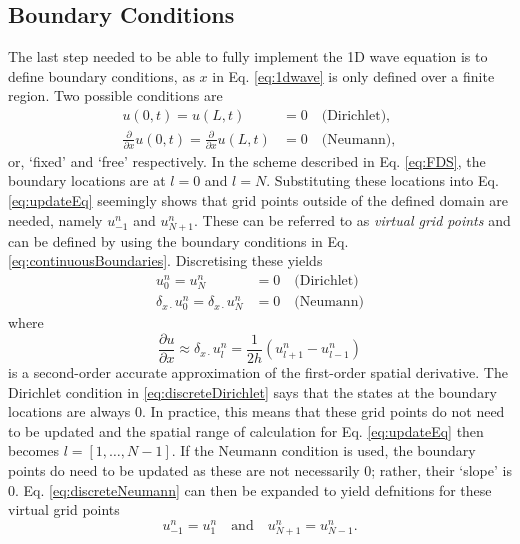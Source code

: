 \documentclass[dvipsnames, reprint]{JASA}
\begin{document}
\subsection{Boundary Conditions}
The last step needed to be able to fully implement the 1D wave equation is to define boundary conditions, as $x$ in Eq. \eqref{eq:1dwave} is only defined over a finite region. Two possible conditions are
\begin{subequations}\label{eq:continuousBoundaries}
    \begin{align}
        u(0, t) = u(L, t) &= 0\quad \text{(Dirichlet)},\label{eq:contDirichlet}\\
        \frac{\partial}{\partial x} u(0, t) = \frac{\partial}{\partial x} u(L, t) &= 0\quad \text{(Neumann)},\label{eq:contNeumann}
    \end{align}
\end{subequations}
or, `fixed' and `free' respectively. In the scheme described in Eq. \eqref{eq:FDS}, the boundary locations are at $l = 0$ and $l = N$. Substituting these locations into Eq. \eqref{eq:updateEq} seemingly shows that grid points outside of the defined domain are needed, namely $u_{-1}^n$ and $u_{N+1}^n$. These can be referred to as \textit{virtual grid points} and can be defined by using the boundary conditions in Eq. \eqref{eq:continuousBoundaries}. Discretising these yields
\begin{subequations}
    \begin{align}
        u_0^n = u_N^n &= 0 \quad\text{(Dirichlet)}\label{eq:discreteDirichlet}\\
        \delta_{x\cdot} u_0^n = \delta_{x\cdot} u_N^n &= 0 \quad \text{(Neumann)}\label{eq:discreteNeumann}
    \end{align}
\end{subequations}
where 
\begin{equation}
    \frac{\partial u}{\partial x} \approx \delta_{x\cdot}u_l^n = \frac{1}{2h}\left(u_{l+1}^n - u_{l-1}^n\right)
\end{equation}
is a second-order accurate approximation of the first-order spatial derivative. The Dirichlet condition in \eqref{eq:discreteDirichlet} says that the states at the boundary locations are always 0. In practice, this means that these grid points do not need to be updated and the spatial range of calculation for Eq. \eqref{eq:updateEq} then becomes $l = [1, \hdots, N-1]$. If the Neumann condition is used, the boundary points do need to be updated as these are not necessarily $0$; rather, their `slope' is $0$. Eq. \eqref{eq:discreteNeumann} can then be expanded to yield defnitions for these virtual grid points
\begin{equation}\label{eq:neumannSolution}
    u_{-1}^n = u_1^n \quad \text{and} \quad u_{N+1}^n = u_{N-1}^n.
\end{equation}
\end{document}
